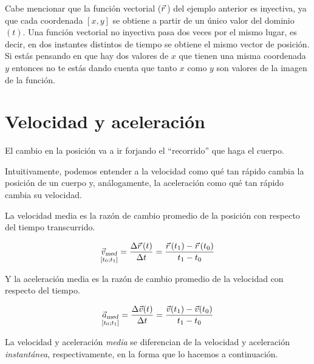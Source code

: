Cabe mencionar que la función vectorial ($\xyz$) del ejemplo anterior es inyectiva, ya que cada coordenada $[x,y]$ se obtiene a partir de un único valor del dominio $(t)$.
Una función vectorial no inyectiva pasa dos veces por el mismo lugar, es decir, en dos instantes distintos de tiempo se obtiene el mismo vector de posición.
Si estás pensando en que hay dos valores de $x$ que tienen una misma coordenada $y$ entonces no te estás dando cuenta que tanto $x$ como $y$ son valores de la imagen de la función.


\section{Velocidad y aceleración}

El cambio en la posición va a ir forjando el ``recorrido'' que haga el cuerpo.

Intuitivamente, podemos entender a la velocidad como qué tan rápido cambia la posición de un cuerpo y, análogamente, la aceleración como qué tan rápido cambia su velocidad.

La velocidad media es la razón de cambio promedio de la posición con respecto del tiempo transcurrido.

\begin{mdframed}[style=DefinitionFrame]
    \begin{defn}
    \end{defn}
    \begin{equation*}
        \media{\Vec{v}}{\left[ t_0 ; t_1 \right]}
      = \dfrac{\Delta \xyz(t)}{\Delta t}
      = \dfrac{\xyz(t_1)-\xyz(t_0)}{t_1-t_0}
    \end{equation*}
\end{mdframed}

Y la aceleración media es la razón de cambio promedio de la velocidad con respecto del tiempo.

\begin{mdframed}[style=DefinitionFrame]
    \begin{defn}
    \end{defn}
    \begin{equation*}
        \media{\Vec{a}}{\left[ t_0 ; t_1 \right]}
      = \dfrac{\Delta \Vec{v}(t)}{\Delta t}
      = \dfrac{\Vec{v}(t_1)-\Vec{v}(t_0)}{t_1-t_0}
    \end{equation*}
\end{mdframed}

La velocidad y aceleración \emph{media} se diferencian de la velocidad y aceleración \emph{instantánea}, respectivamente, en la forma que lo hacemos a continuación.


